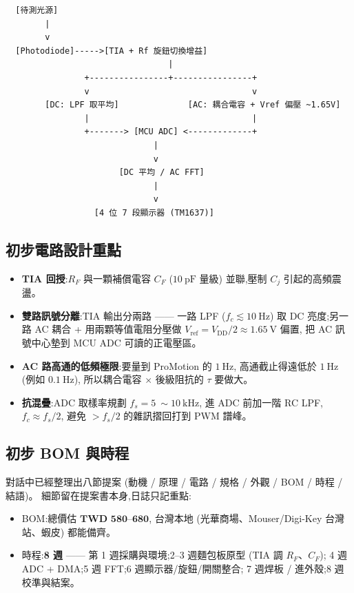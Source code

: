 \begin{verbatim}
  [待測光源]
        |
        v
  [Photodiode]----->[TIA + Rf 旋鈕切換增益]
                                 |
                +----------------+----------------+
                v                                 v
        [DC: LPF 取平均]              [AC: 耦合電容 + Vref 偏壓 ~1.65V]
                |                                 |
                +-------> [MCU ADC] <-------------+
                              |
                              v
                       [DC 平均 / AC FFT]
                              |
                              v
                  [4 位 7 段顯示器 (TM1637)]
\end{verbatim}

\subsection*{初步電路設計重點}

\begin{itemize}[leftmargin=2em,itemsep=0pt]
  \item \textbf{TIA 回授}:\(R_F\) 與一顆補償電容 \(C_F\)
        (\(\SI{10}{\pico\farad}\) 量級) 並聯,壓制 \(C_j\) 引起的高頻震盪。
  \item \textbf{雙路訊號分離}:TIA 輸出分兩路 —— 一路 LPF (\(f_c \lesssim \SI{10}{\hertz}\))
        取 DC 亮度;另一路 AC 耦合 + 用兩顆等值電阻分壓做
        \(V_\text{ref} = V_\text{DD}/2 \approx \SI{1.65}{\volt}\) 偏置,
        把 AC 訊號中心墊到 MCU ADC 可讀的正電壓區。
  \item \textbf{AC 路高通的低頻極限}:要量到 ProMotion 的 \(\SI{1}{\hertz}\),
        高通截止得遠低於 \(\SI{1}{\hertz}\) (例如 \(\SI{0.1}{\hertz}\)),
        所以耦合電容 \(\times\) 後級阻抗的 \(\tau\) 要做大。
  \item \textbf{抗混疊}:ADC 取樣率規劃 \(f_s = \SI{5}{}\sim\SI{10}{\kilo\hertz}\),
        進 ADC 前加一階 RC LPF,\(f_c \approx f_s/2\),
        避免 \(>f_s/2\) 的雜訊摺回打到 PWM 譜峰。
\end{itemize}

\subsection*{初步 BOM 與時程}

對話中已經整理出八節提案 (動機 / 原理 / 電路 / 規格 / 外觀 / BOM / 時程 / 結語)。
細節留在提案書本身,日誌只記重點:

\begin{itemize}[leftmargin=2em,itemsep=0pt]
  \item BOM:總價估 \(\textbf{TWD 580--680}\),
        台灣本地 (光華商場、Mouser/Digi-Key 台灣站、蝦皮) 都能備齊。
  \item 時程:\textbf{8 週} —— 第 1 週採購與環境;2--3 週麵包板原型 (TIA 調 \(R_F\)、\(C_F\));
        4 週 ADC + DMA;5 週 FFT;6 週顯示器/旋鈕/開關整合;
        7 週焊板 / 進外殼;8 週校準與結案。
\end{itemize}

